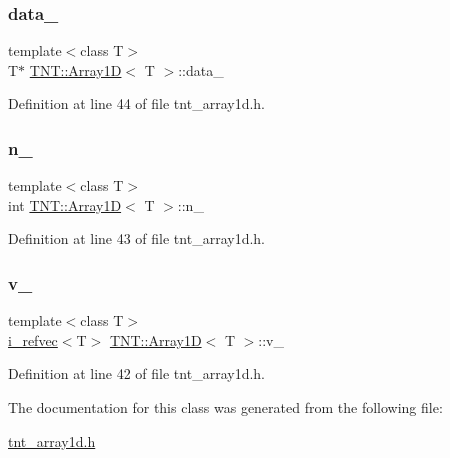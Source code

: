 \subsubsection{\texorpdfstring{data\+\_\+}{data\_}}
{\footnotesize\ttfamily template$<$class T$>$ \\
T$\ast$ \hyperlink{classTNT_1_1Array1D}{T\+N\+T\+::\+Array1D}$<$ T $>$\+::data\+\_\+\hspace{0.3cm}{\ttfamily [private]}}



Definition at line 44 of file tnt\+\_\+array1d.\+h.

\mbox{\label{classTNT_1_1Array1D_a5a3bd03e084859897266908355648fbb}} 
\subsubsection{\texorpdfstring{n\+\_\+}{n\_}}
{\footnotesize\ttfamily template$<$class T$>$ \\
int \hyperlink{classTNT_1_1Array1D}{T\+N\+T\+::\+Array1D}$<$ T $>$\+::n\+\_\+\hspace{0.3cm}{\ttfamily [private]}}



Definition at line 43 of file tnt\+\_\+array1d.\+h.

\mbox{\label{classTNT_1_1Array1D_a87c970ad54ef696289601c549e2bb1f2}} 
\subsubsection{\texorpdfstring{v\+\_\+}{v\_}}
{\footnotesize\ttfamily template$<$class T$>$ \\
\hyperlink{classTNT_1_1i__refvec}{i\+\_\+refvec}$<$T$>$ \hyperlink{classTNT_1_1Array1D}{T\+N\+T\+::\+Array1D}$<$ T $>$\+::v\+\_\+\hspace{0.3cm}{\ttfamily [private]}}



Definition at line 42 of file tnt\+\_\+array1d.\+h.



The documentation for this class was generated from the following file\+:\begin{DoxyCompactItemize}
\item 
\hyperlink{tnt__array1d_8h}{tnt\+\_\+array1d.\+h}\end{DoxyCompactItemize}
